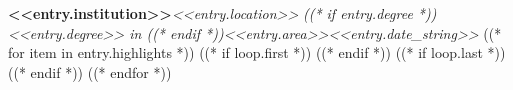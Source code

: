 \resumeSubheading
    {\textbf{<<entry.institution>>}}{\textit{<<entry.location>>}}
    {\textit{((* if entry.degree *))<<entry.degree>> in ((* endif *))<<entry.area>>}}{\textit{<<entry.date_string>>}}
((* for item in entry.highlights *))
    ((* if loop.first *))
    \resumeItemListStart
    ((* endif *))
    ((* if loop.last *))
    \resumeItemListEnd
    ((* endif *))
((* endfor *))